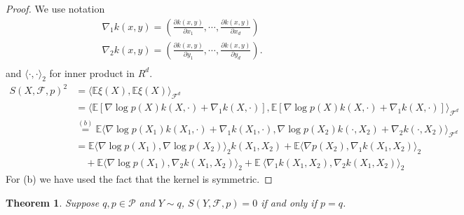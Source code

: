 \documentclass{article}
\newtheorem{Theorem}{Theorem}
\newcommand{\ev}{\mathbb{E}}
\begin{document}
\begin{proof}
We use notation 
\begin{align*}
 \nabla_1 k(x,y) = \left( \frac{\partial k(x,y) }{\partial x_1}, \cdots, \frac{\partial k(x,y) }{\partial x_d} \right) \\
 \nabla_2 k(x,y) = \left( \frac{\partial k(x,y) }{\partial y_1}, \cdots, \frac{\partial k(x,y) }{\partial y_d} \right). \\ 
\end{align*}
and $\langle \cdot, \cdot\rangle_2 $ for inner product in $R^d$.
\begin{align*}
S(X,\mathcal{F},p)^2 & = \langle \ev \xi(X), \ev \xi(X) \rangle_{\mathcal{F}^d } \\
& = \langle \ev \left[\nabla \log p(X) k(X,\cdot)+\nabla_1 k(X,\cdot)\right] ,\ev \left[\nabla \log p(X) k(X,\cdot)+\nabla_1 k(X,\cdot)\right] \rangle_{\mathcal{F}^d } \\
& \overset{(b)}{=} \ev \langle   \nabla \log p(X_1) k(X_1,\cdot) + \nabla_1 k(X_1,\cdot) , \nabla \log p(X_2) k(\cdot,X_2) + \nabla_2 k(\cdot,X_2) \rangle_{\mathcal{F}^d } \\
& = \ev\langle \nabla \log p(X_1) , \nabla\log p(X_2) \rangle_{2} k(X_1,X_2) + \ev \langle \nabla p(X_2),  \nabla_1 k(X_1,X_2) \rangle_{2} \\
  & \quad +  \ev \langle \nabla  \log p(X_1), \nabla_{2}  k(X_1,X_2) \rangle_{2} +  \ev\ \langle  \nabla_1 k(X_1,X_2), \nabla_2 k(X_1,X_2) \rangle_{2}
\end{align*}
For (b) we have used the fact that the kernel is symmetric.
\end{proof}

\begin{Theorem}
\label{th2}
Suppose  $q,p \in \mathcal{P}$ and $Y \sim q$, $S(Y,\mathcal{F},p) = 0$ if and only if $p=q$.
\end{Theorem}
\end{document}
